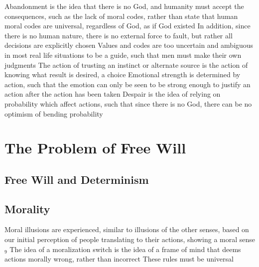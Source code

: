 \documentclass[11 pt, twoside]{article}
\newenvironment{outline*}
{
	\begin{outline}[enumerate]
	}
	{\end{outline}
}
\newcommand{\foota}[1]{\hyperlink{#1}{$_#1$}}
\begin{document}
\begin{outline*}
\1 Abandonment is the idea that there is no God, and humanity must accept the consequences, such as the lack of moral codes, rather than state that human moral codes are universal, regardless of God, as if God existed
\2 In addition, since there is no human nature, there is no external force to fault, but rather all decisions are explicitly chosen
\2 Values and codes are too uncertain and ambiguous in most real life situations to be a guide, such that men must make their own judgments
\2 The action of trusting an instinct or alternate source is the action of knowing what result is desired, a choice
\2 Emotional strength is determined by action, such that the emotion can only be seen to be strong enough to justify an action after the action has been taken
\1 Despair is the idea of relying on probability which affect actions, such that since there is no God, there can be no optimism of bending probability
\2 
\end{outline*}

\section{The Problem of Free Will}
\subsection{Free Will and Determinism}
\begin{outline*}

\end{outline*}
\subsection{Morality}
\begin{outline*}
\1 Moral illusions are experienced, similar to illusions of the other senses, based on our initial perception of people translating to their actions, showing a moral sense \foota{9}
\1 The idea of a moralization switch is the idea of a frame of mind  that deems actions morally wrong, rather than incorrect
\2 These rules must be universal
\end{outline*}
\end{document}
